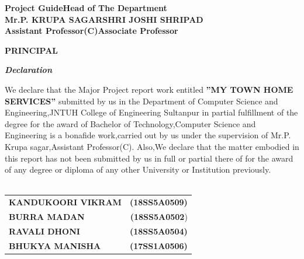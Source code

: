 \documentclass[12pt,a4paper]{report}
\begin{document}
\begin{titlepage}
\vspace{0.5in}
\noindent
\textbf{Project Guide}\hspace{3.0in}\textbf{Head of The Department}\\
\hspace{2.5in}
\textbf{Mr.P. KRUPA SAGAR}\hspace{2.3in}\textbf{SHRI JOSHI SHRIPAD}\\
\hspace{0.3in}\textbf{Assistant Professor(C)}\hspace{2.7in}\textbf{Associate Professor}\\
\vspace{0.3in}
\begin{center}
    \textbf{PRINCIPAL}\\
\end{center}

\newpage
{}
	\setcounter{page}{2}

\begin{center}
	\textbf{\textit{\Large Declaration}}
\end{center}
	\vspace{.5 cm}
	\large
	We declare that the Major Project report work entitled \textbf{”MY TOWN HOME SERVICES”} submitted by us in the Department of Computer Science and Engineering,JNTUH College of Engineering Sultanpur in partial fulfillment of the degree for the award of Bachelor of Technology,Computer Science and Engineering is a bonafide work,carried out by us under the supervision of Mr.P. Krupa sagar,Assistant Professor(C). Also,We declare that the matter embodied in this report has not been submitted by us in full or partial there of for the award of any degree or diploma of any other University or Institution previously.\\\\

 \begin{table}[ht]
			\begin{flushright}
			       \begin{tabular}{l r}
				{\large \textbf{KANDUKOORI VIKRAM}} & {\large \textbf{(18SS5A0509)}}\\
				{\large \textbf{BURRA MADAN}} & {\large \textbf{(18SS5A0502}})\\
				{\large \textbf{RAVALI DHONI}} & {\large \textbf{(18SS5A0504)}}\\
				{\large \textbf{BHUKYA MANISHA}} & {\large \textbf{(17SS1A0506)}}\\
			\end{tabular} 
			\end{flushright}{}
			

\end{table}
\end{titlepage}
\end{document}
